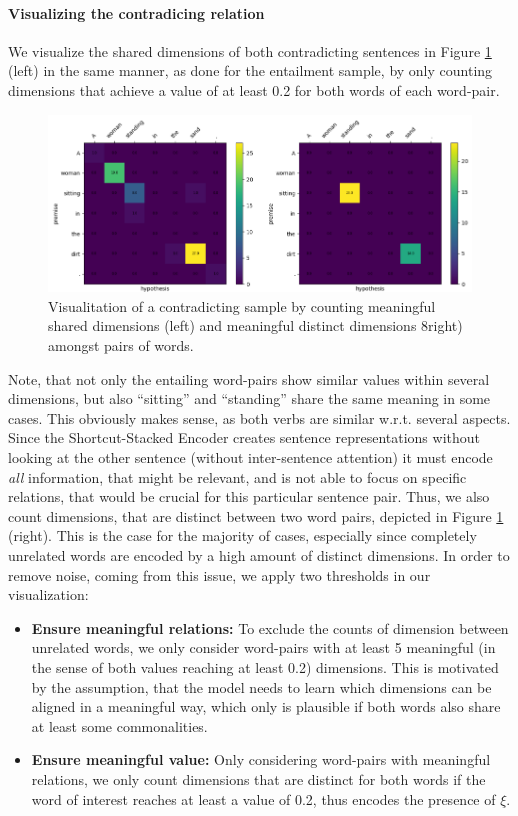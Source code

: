 \paragraph*{Visualizing the contradicing relation}
We visualize the shared dimensions of both contradicting sentences in Figure \ref{fig:alignment_contr_sample_general} (left) in the same manner, as done for the entailment sample, by only counting dimensions that achieve a value of at least 0.2 for both words of each word-pair. 
\begin{figure}[tph!]
\centering
	\includegraphics[totalheight=7cm]{fig/alignment_contr_sample_general.png}
	\caption{Visualitation of a contradicting sample by counting meaningful shared dimensions (left) and meaningful distinct dimensions 8right) amongst pairs of words.}
	\label{fig:alignment_contr_sample_general}
\end{figure}
Note, that not only the entailing word-pairs show similar values within several dimensions, but also ``sitting'' and ``standing'' share the same meaning in some cases. This obviously makes sense, as both verbs are similar w.r.t. several aspects. Since the Shortcut-Stacked Encoder creates sentence representations without looking at the other sentence (without inter-sentence attention) it must encode \textit{all} information, that might be relevant, and is not able to focus on specific relations, that would be crucial for this particular sentence pair. Thus, we also count dimensions, that are distinct between two word pairs, depicted in Figure \ref{fig:alignment_contr_sample_general} (right). This is the case for the majority of cases, especially since completely unrelated words are encoded by a high amount of distinct dimensions. In order to remove noise, coming from this issue, we apply two thresholds in our visualization:
\begin{itemize}
\item \textbf{Ensure meaningful relations:} To exclude the counts of dimension between unrelated words, we only consider word-pairs with at least 5 meaningful (in the sense of both values reaching at least 0.2) dimensions. This is motivated by the assumption, that the model needs to learn which dimensions can be aligned in a meaningful way, which only is plausible if both words also share at least some commonalities. 
\item \textbf{Ensure meaningful value:} Only considering word-pairs with meaningful relations, we only count dimensions that are distinct for both words if the word of interest reaches at least a value of 0.2, thus encodes the presence of $\xi$.
\end{itemize}
